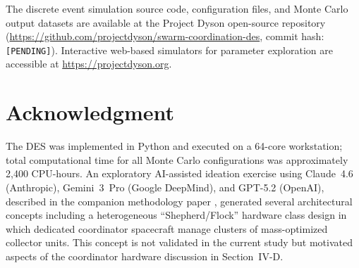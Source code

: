 \documentclass[journal]{IEEEtran}
\begin{document}
The discrete event simulation source code, configuration files, and Monte Carlo output datasets are available at the Project Dyson open-source repository (\url{https://github.com/projectdyson/swarm-coordination-des}, commit hash: \texttt{[PENDING]}). Interactive web-based simulators for parameter exploration are accessible at \url{https://projectdyson.org}.

\section*{Acknowledgment}

The DES was implemented in Python and executed on a 64-core workstation; total computational time for all Monte Carlo configurations was approximately 2{,}400 CPU-hours. An exploratory AI-assisted ideation exercise using Claude~4.6 (Anthropic), Gemini~3~Pro (Google DeepMind), and GPT-5.2 (OpenAI), described in the companion methodology paper \cite{dyson_multimodel}, generated several architectural concepts including a heterogeneous ``Shepherd/Flock'' hardware class design in which dedicated coordinator spacecraft manage clusters of mass-optimized collector units. This concept is not validated in the current study but motivated aspects of the coordinator hardware discussion in Section~IV-D.
\end{document}
